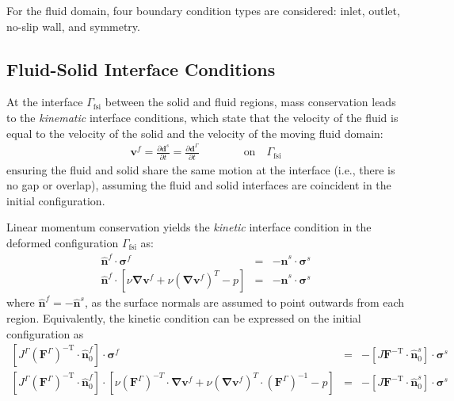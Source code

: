 \documentclass[sn-mathphys,Numbered]{sn-jnl}%
\newcommand{\bb}{\boldsymbol}
\begin{document}
For the fluid domain, four boundary condition types are considered: inlet, outlet, no-slip wall, and symmetry.


\subsection{Fluid-Solid Interface Conditions} \label{sec:fsi_interface}
At the interface $\Gamma_\text{fsi}$ between the solid and fluid regions, mass conservation leads to the \emph{kinematic} interface conditions, which state that the velocity of the fluid is equal to the velocity of the solid and the velocity of the moving fluid domain:
\begin{eqnarray} \label{eqn:kinematic}
	\bb{v}^f = \frac{\partial \bb{d}^s}{\partial t} = \frac{\partial \bb{d}^\Gamma}{\partial t}
	\quad\quad\quad\quad\text{on}\quad \Gamma_\text{fsi}
\end{eqnarray}
ensuring the fluid and solid share the same motion at the interface (i.e., there is no gap or overlap), assuming the fluid and solid interfaces are coincident in the initial configuration.


Linear momentum conservation yields the \emph{kinetic} interface condition in the deformed configuration $\Gamma_\text{fsi}$ as:
\begin{eqnarray} \label{eqn:kinetic_deformed}
	\hat{\bb{n}}^f \cdot \bb{\sigma}^f &=& -\hat{\bb{n}}^s \cdot \bb{\sigma}^s \\
	\hat{\bb{n}}^f \cdot \left[\nu \bb{\nabla} \bb{v}^f + \nu \left(\bb{\nabla} \bb{v}^f \right)^T - p \right]
		&=& -\hat{\bb{n}}^s \cdot \bb{\sigma}^s
\end{eqnarray}
where $\hat{\bb{n}}^f = -\hat{\bb{n}}^s$, as the surface normals are assumed to point outwards from each region.
Equivalently, the kinetic condition can be expressed on the initial configuration as
\begin{eqnarray} \label{eqn:kinetic_initial}
	\left[ J^\Gamma (\bb{F}^\Gamma)^{-\text{T}} \cdot \hat{\bb{n}}_0^f \right] \cdot \bb{\sigma}^f &=&
	-\left[ J \bb{F}^{-\text{T}} \cdot \hat{\bb{n}}_0^s \right] \cdot \bb{\sigma}^s \\
	\left[ J^\Gamma (\bb{F}^\Gamma)^{-\text{T}} \cdot \hat{\bb{n}}_0^f \right]
	 \cdot 
	 \left[
	 \nu (\bb{F}^\Gamma)^{-T} \cdot \bb{\nabla} \bb{v}^f 
	 + \nu \left(\bb{\nabla} \bb{v}^f \right)^T \cdot (\bb{F}^\Gamma)^{-1}
	 - p
	 \right]
	&=& 
	-\left[ J \bb{F}^{-\text{T}} \cdot \hat{\bb{n}}_0^s \right] \cdot \bb{\sigma}^s
\end{eqnarray}
\end{document}
